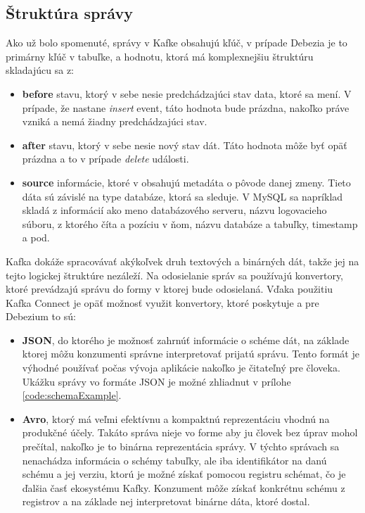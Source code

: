 \subsection{Štruktúra správy} \label{ssec:message_structure}
Ako už bolo spomenuté, správy v Kafke obsahujú kľúč, v prípade Debezia je to primárny kľúč v tabuľke, a hodnotu, ktorá má komplexnejšiu štruktúru skladajúcu sa z:
\begin{itemize}
\item \textbf{before} stavu, ktorý v sebe nesie predchádzajúci stav data, ktoré sa mení. V prípade, že nastane \textit{insert} event, táto hodnota bude prázdna, nakoľko práve vzniká a nemá žiadny predchádzajúci stav.
\item \textbf{after} stavu, ktorý v sebe nesie nový stav dát. Táto hodnota môže byť opäť prázdna a to v prípade \textit{delete} události.
\item \textbf{source} informácie, ktoré v obsahujú metadáta o pôvode danej zmeny. Tieto dáta sú závislé na type databáze, ktorá sa sleduje. V MySQL sa napríklad skladá z informácií ako meno databázového serveru, názvu logovacieho súboru, z ktorého číta a pozíciu v ňom, názvu databáze a tabuľky, timestamp a pod.
\end{itemize}

Kafka dokáže spracovávať akýkoľvek druh textových a binárných dát, takže jej na tejto logickej štruktúre nezáleží. Na odosielanie správ sa používajú konvertory, ktoré prevádzajú správu do formy v ktorej bude odosielaná. Vďaka použitiu Kafka Connect je opäť možnosť využit konvertory, ktoré poskytuje a pre Debezium to sú:
\begin{itemize}
\item \textbf{JSON}, do ktorého je možnosť zahrnúť informácie o schéme dát, na základe ktorej môžu konzumenti správne interpretovať prijatú správu. Tento formát je výhodné používať počas vývoja aplikácie nakoľko je čitateľný pre človeka. Ukážku správy vo formáte JSON je možné zhliadnut v prílohe \ref{code:schemaExample}.
\item \textbf{Avro}, ktorý má veľmi efektívnu a kompaktnú reprezentáciu vhodnú na produkčné účely. Takáto správa nieje vo forme aby ju človek bez úprav mohol prečítal, nakoľko je to binárna reprezentácia správy. V týchto správach sa nenachádza informácia o schémy tabuľky, ale iba identifikátor na danú schému a jej verziu, ktorú je možné získať pomocou registru schémat, čo je ďalšia časť ekosystému Kafky. Konzument môže získať konkrétnu schému z registrov a na základe nej interpretovat binárne dáta, ktoré dostal.
\end{itemize}


